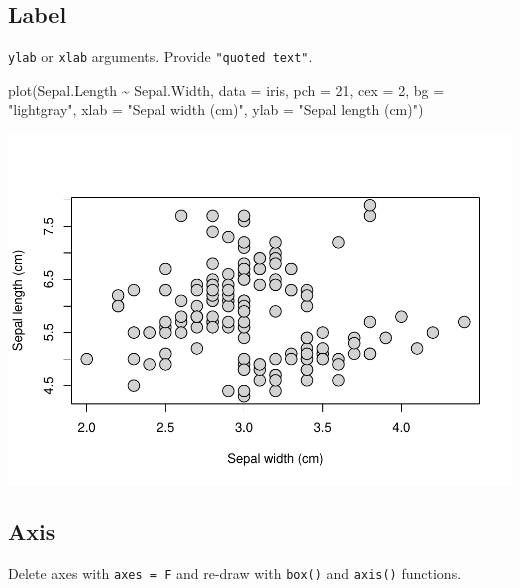 \documentclass[
]{book}
\newenvironment{Shaded}{\begin{snugshade}}{\end{snugshade}}
\newcommand{\AttributeTok}[1]{\textcolor[rgb]{0.77,0.63,0.00}{#1}}
\newcommand{\DecValTok}[1]{\textcolor[rgb]{0.00,0.00,0.81}{#1}}
\newcommand{\FunctionTok}[1]{\textcolor[rgb]{0.00,0.00,0.00}{#1}}
\newcommand{\NormalTok}[1]{#1}
\newcommand{\SpecialCharTok}[1]{\textcolor[rgb]{0.00,0.00,0.00}{#1}}
\newcommand{\StringTok}[1]{\textcolor[rgb]{0.31,0.60,0.02}{#1}}
\begin{document}
\hypertarget{label}{%
\subsection{Label}\label{label}}

\texttt{ylab} or \texttt{xlab} arguments. Provide \texttt{"quoted\ text"}.

\begin{Shaded}
\begin{Highlighting}[]
\FunctionTok{plot}\NormalTok{(Sepal.Length }\SpecialCharTok{\textasciitilde{}}\NormalTok{ Sepal.Width, }\AttributeTok{data =}\NormalTok{ iris,}
     \AttributeTok{pch =} \DecValTok{21}\NormalTok{, }\AttributeTok{cex =} \DecValTok{2}\NormalTok{, }\AttributeTok{bg =} \StringTok{"lightgray"}\NormalTok{,}
     \AttributeTok{xlab =} \StringTok{"Sepal width (cm)"}\NormalTok{, }\AttributeTok{ylab =} \StringTok{"Sepal length (cm)"}\NormalTok{)}
\end{Highlighting}
\end{Shaded}

\begin{center}\includegraphics{_main_files/figure-latex/unnamed-chunk-121-1} \end{center}

\hypertarget{axis}{%
\subsection{Axis}\label{axis}}

Delete axes with \texttt{axes\ =\ F} and re-draw with \texttt{box()} and \texttt{axis()} functions.
\end{document}
